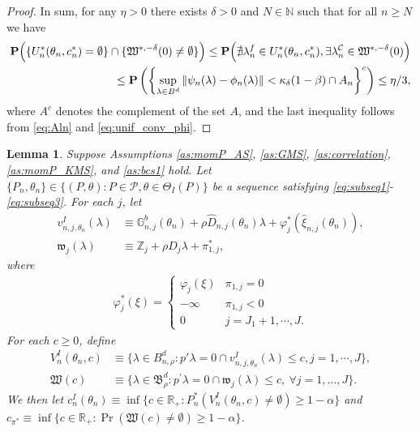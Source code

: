 \documentclass[letterpaper,11pt]{article}
\theoremstyle{myplain}
\newtheorem{lemma}{Lemma}[section]
\theoremstyle{mydefinition}
\theoremstyle{myremark}
\newcommand{\HH}{\mathbb{Z}}
\newcommand{\N}{\mathbb{N}}
\newcommand{\R}{\mathbb{R}}
\newcommand{\cC}{\mathcal{C}}
\newcommand{\cP}{\mathcal{P}}
\numberwithin{equation}{section}
\numberwithin{figure}{section}
\begin{document}
\begin{appendices}
\begin{proof}
 In sum, for any $\eta>0$ there exists $\delta > 0$ and  $N \in \N$ such that for all $n \ge N$ we have
 \begin{align}
\mathbf{P}\Big( \{U^*_{n}(\theta_{n},c^{*}_{n})= \emptyset \} \cap \{\mathfrak W^{*,-\delta}(0)\neq \emptyset \} \Big)
\le \mathbf{P}	\Big(\nexists \lambda^f_{n}\in U^*_{n}(\theta_{n},c^{*}_{n}), \exists \lambda^{\cC}_{n}\in \mathfrak W^{*,-\delta}(0) \Big)& \notag \\
\le \mathbf{P}	\left(\left\{\sup_{\lambda \in  B^d}\Vert \psi_{n}(\lambda) -\phi_{n}(\lambda)\Vert<\kappa_\delta(1-\beta) \cap A_{n} \right\}^c \right)\le \eta/3,&\label{eq:final1}
 \end{align}
where $A^c$ denotes the complement of the set $A$, and the last inequality follows from \eqref{eq:Aln} and \eqref{eq:unif_conv_phi}. 
\end{proof}

\begin{lemma}\label{lem:cv_convergence}
Suppose Assumptions \ref{as:momP_AS}, \ref{as:GMS},  \ref{as:correlation}, \ref{as:momP_KMS}, and \ref{as:bcs1} hold.
Let	$\{P_n,\theta_n\} \in \{(P,\theta):P \in \cP,\theta \in \Theta_I(P)\}$ be a sequence satisfying \eqref{eq:subseq1}-\eqref{eq:subseq3}. 
For each $j$, let
\begin{align}
v^I_{n,j,\theta_n}(\lambda)&\equiv	\mathbb G^b_{n,j}(\theta_n)+\rho\hat{D}_{n,j}(\theta_n)\lambda+\varphi^*_j(\hat{\xi}_{n,j}(\theta_n)),\label{eq:vIj_var}\\
\mathfrak{w}_{j}(\lambda)&\equiv \HH_{j}+\rho D_{j}\lambda+\pi^*_{1,j},
\end{align}
where 
\begin{align}
\varphi^*_j(\xi)=\begin{cases}
	\varphi_j(\xi)&\pi_{1,j}=0\\
	-\infty&\pi_{1,j}<0\\
	0&j=J_1+1,\cdots,J.
\end{cases}\label{eq:greedy_gms}	
\end{align}
For each $c\ge0$, define
\begin{align}
V^I_n(\theta_n,c)&\equiv \{\lambda\in B^d_{n,\rho}:p'\lambda=0\cap v^I_{n,j,\theta_n}(\lambda)\le c,j=1,\cdots,J\},\label{eq:VIn}\\
\mathfrak{W}(c)&\equiv \big\{ \lambda\in \mathfrak B^d_\rho: p^\prime \lambda = 0 \cap \mathfrak w_{j}(\lambda)\le c, \: \forall j=1,\dots,J\big\}.
\end{align}
We then let $c^I_n(\theta_n)\equiv \inf\{c\in\R_+:P^*_n(V^I_n(\theta_n,c)\neq \emptyset)\ge 1-\alpha\}$ and $c_{\pi^*}\equiv \inf\{c\in\mathbb R_+:\Pr(\mathfrak{W}(c)\ne\emptyset)\ge 1-\alpha\}$.


\end{lemma}
\end{appendices}
\end{document}
